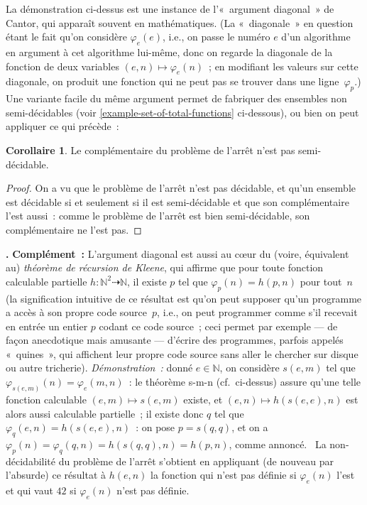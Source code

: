 \documentclass[12pt,a4paper]{article}
\theoremstyle{definition}
\newcommand\thingy{%
\refstepcounter{comcnt}\medskip\noindent\textbf{\thecomcnt.} }
\newtheorem{cor}[comcnt]{Corollaire}
\begin{document}
La démonstration ci-dessus est une instance de l'« argument diagonal »
de Cantor, qui apparaît souvent en mathématiques.  (La « diagonale »
en question étant le fait qu'on considère $\varphi_e(e)$, i.e., on
passe le numéro $e$ d'un algorithme en argument à cet algorithme
lui-même, donc on regarde la diagonale de la fonction de deux
variables $(e,n) \mapsto \varphi_e(n)$ ; en modifiant les valeurs sur
cette diagonale, on produit une fonction qui ne peut pas se trouver
dans une ligne $\varphi_p$.)  Une variante facile du même argument
permet de fabriquer des ensembles non semi-décidables (voir
\ref{example-set-of-total-functions} ci-dessous), ou bien on peut
appliquer ce qui précède :

\begin{cor}
Le complémentaire du problème de l'arrêt n'est pas semi-décidable.
\end{cor}
\begin{proof}
On a vu que le problème de l'arrêt n'est pas décidable, et qu'un
ensemble est décidable si et seulement si il est semi-décidable et que
son complémentaire l'est aussi : comme le problème de l'arrêt est bien
semi-décidable, son complémentaire ne l'est pas.
\end{proof}

{\footnotesize\thingy\textbf{Complément :} L'argument diagonal est
  aussi au cœur du (voire, équivalent au) \emph{théorème de récursion
    de Kleene}, qui affirme que pour toute fonction calculable
  partielle $h\colon\mathbb{N}^2\dasharrow\mathbb{N}$, il existe $p$
  tel que $\varphi_p(n) = h(p,n)$ pour tout $n$ (la signification
  intuitive de ce résultat est qu'on peut supposer qu'un programme a
  accès à son propre code source $p$, i.e., on peut programmer comme
  s'il recevait en entrée un entier $p$ codant ce code source ; ceci
  permet par exemple — de façon anecdotique mais amusante — d'écrire
  des programmes, parfois appelés « quines », qui affichent leur
  propre code source sans aller le chercher sur disque ou autre
  tricherie).  \textit{Démonstration :} donné $e \in \mathbb{N}$, on
  considère $s(e,m)$ tel que $\varphi_{s(e,m)}(n) = \varphi_e(m,n)$ :
  le théorème s-m-n (cf. ci-dessus) assure qu'une telle fonction
  calculable $(e,m) \mapsto s(e,m)$ existe, et $(e,n) \mapsto
  h(s(e,e), n)$ est alors aussi calculable partielle ; il existe donc
  $q$ tel que $\varphi_q(e,n) = h(s(e,e), n)$ : on pose $p = s(q,q)$,
  et on a $\varphi_p(n) = \varphi_q(q,n) = h(s(q,q), n) = h(p, n)$,
  comme annoncé. \smiley\ La non-décidabilité du problème de l'arrêt
  s'obtient en appliquant (de nouveau par l'absurde) ce résultat à
  $h(e, n)$ la fonction qui n'est pas définie si $\varphi_e(n)$ l'est
  et qui vaut $42$ si $\varphi_e(n)$ n'est pas définie.\par}
\end{document}
